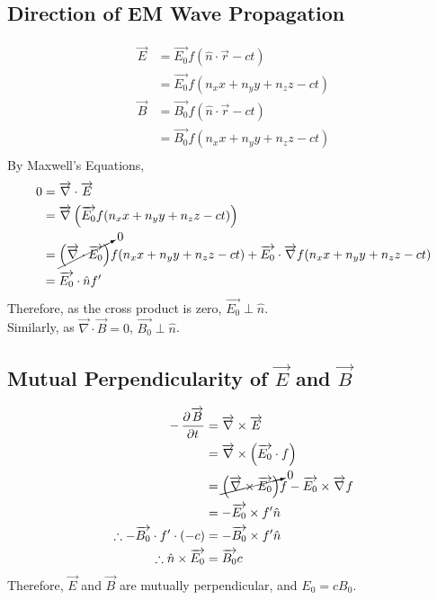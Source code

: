 \documentclass[fleqn, a4paper, 12pt, twoside]{article}
\theoremstyle{definition}
\theoremstyle{theorem}
\begin{document}
\subsection{Direction of EM Wave Propagation}

\begin{align*}
	\overrightarrow{E} &= \overrightarrow{E_0} f\left( \hat{n} \cdot \overrightarrow{r} - c t \right)\\
	&= \overrightarrow{E_0} f(n_x x + n_y y + n_z z - c t)\\
	\overrightarrow{B} &= \overrightarrow{B_0} f\left( \hat{n} \cdot \overrightarrow{r} - c t \right)\\
	&= \overrightarrow{B_0} f(n_x x + n_y y + n_z z - c t)\\
\end{align*}
By Maxwell's Equations,
\begin{align*}
	0 &=\overrightarrow{\nabla} \cdot \overrightarrow{E}\\
	&= \overrightarrow{\nabla} \left( \overrightarrow{E_0} f(n_x x + n_y y + n_z z - c t) \right)\\
	&= \cancelto{0}{\left( \overrightarrow{\nabla} \cdot \overrightarrow{E_0} \right)} f(n_x x + n_y y + n_z z - c t) + \overrightarrow{E_0} \cdot \overrightarrow{\nabla} f(n_x x + n_y y + n_z z - c t)\\
	&= \overrightarrow{E_0} \cdot \hat{n} f'
\end{align*}
Therefore, as the cross product is zero, $\overrightarrow{E_0} \perp \hat{n}$.\\
Similarly, as $\overrightarrow{\nabla} \cdot \overrightarrow{B} = 0$, $\overrightarrow{B_0} \perp \hat{n}$.

\subsection{Mutual Perpendicularity of $\overrightarrow{E}$ and $\overrightarrow{B}$}

\begin{align*}
	-\dpd{\overrightarrow{B}}{t} &= \overrightarrow{\nabla} \times \overrightarrow{E}\\
	&= \overrightarrow{\nabla} \times \left( \overrightarrow{E_0} \cdot f \right)\\
	&= \cancelto{0}{\left( \overrightarrow{\nabla} \times \overrightarrow{E_0} \right)} f - \overrightarrow{E_0} \times \overrightarrow{\nabla} f\\
	&= -\overrightarrow{E_0} \times f' \hat{n}\\
	\therefore -\overrightarrow{B_0} \cdot f' \cdot (-c) &= -\overrightarrow{B_0} \times f' \hat{n}\\
	\therefore \hat{n} \times \overrightarrow{E_0} &= \overrightarrow{B_0} c
\end{align*}
Therefore, $\overrightarrow{E}$ and $\overrightarrow{B}$ are mutually perpendicular, and $E_0 = c B_0$.
\end{document}
